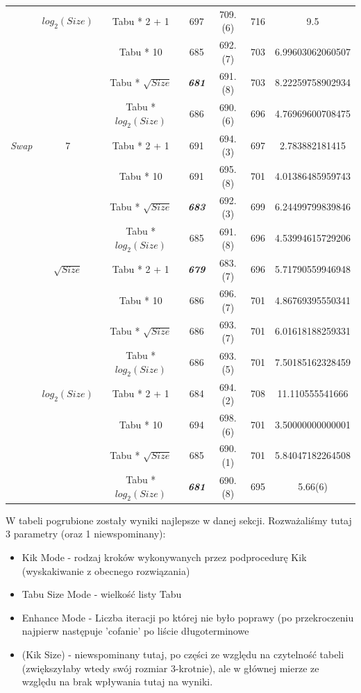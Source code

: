 \documentclass{article}
\begin{document}
\begin{table}[h!]
\begin{tabular}{c|c|c||c|c|c|c}
	\cline{2-7}
	 & $log_2(Size)$ & Tabu * 2 + 1 & 697 & 709.(6) & 716 & 9.5 \\
	 &  & Tabu * 10 & 685 & 692.(7) & 703 & 6.99603062060507 \\
	 &  & Tabu * $\sqrt{Size}$ & \textbf{\textit{681}} & 691.(8) & 703 & 8.22259758902934 \\
	 &  & Tabu * $log_2(Size)$ & 686 & 690.(6) & 696 & 4.76969600708475 \\
\hline
	\textit{Swap} & 7 & Tabu * 2 + 1 & 691 & 694.(3) & 697 & 2.783882181415 \\
	 &  & Tabu * 10 & 691 & 695.(8) & 701 & 4.01386485959743 \\
	 &  & Tabu * $\sqrt{Size}$ & \textbf{\textit{683}} & 692.(3) & 699 & 6.24499799839846 \\
	 &  & Tabu * $log_2(Size)$ & 685 & 691.(8) & 696 & 4.53994615729206 \\
	\cline{2-7}
	 & $\sqrt{Size}$ & Tabu * 2 + 1 & \textbf{\textit{679}} & 683.(7) & 696 & 5.71790559946948 \\
	 &  & Tabu * 10 & 686 & 696.(7) & 701 & 4.86769395550341 \\
	 &  & Tabu * $\sqrt{Size}$ & 686 & 693.(7) & 701 & 6.01618188259331 \\
	 &  & Tabu * $log_2(Size)$ & 686 & 693.(5) & 701 & 7.50185162328459 \\
	\cline{2-7}
	 & $log_2(Size)$ & Tabu * 2 + 1 & 684 & 694.(2) & 708 & 11.110555541666 \\
	 &  & Tabu * 10 & 694 & 698.(6) & 701 & 3.50000000000001 \\
	 &  & Tabu * $\sqrt{Size}$ & 685 & 690.(1) & 701 & 5.84047182264508 \\
	 &  & Tabu * $log_2(Size)$ & \textbf{\textit{681}} & 690.(8) & 695 & 5.66(6) \\
\end{tabular}
\end{table}

\newpage
W tabeli pogrubione zostały wyniki najlepsze w danej sekcji. Rozważaliśmy tutaj 3 parametry (oraz 1 niewspominany):
\begin{itemize}
	\item Kik Mode - rodzaj kroków wykonywanych przez podprocedurę Kik (wyskakiwanie z obecnego rozwiązania)
	\item Tabu Size Mode - wielkość listy Tabu
	\item Enhance Mode - Liczba iteracji po której nie było poprawy (po przekroczeniu najpierw następuje 'cofanie' po liście długoterminowe
	\item (Kik Size) - niewspominany tutaj, po części ze względu na czytelność tabeli (zwiększyłaby wtedy swój rozmiar 3-krotnie), ale w głównej mierze ze względu na brak wpływania tutaj na wyniki.
\end{itemize}
\end{document}
